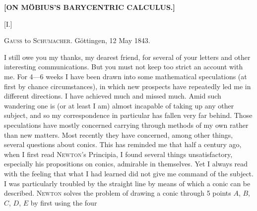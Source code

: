 \clearpage{}
\begin{center}
\textbf{[ON MÖBIUS'S BARYCENTRIC CALCULUS.]}

\medskip

[I.]
\end{center}

\begin{center}\textsc{Gauss} to \textsc{Schumacher}. Göttingen, 12 May 1843.\end{center}

I still owe you my thanks, my dearest friend, for several of your letters and other
interesting communications. But you must not keep too strict an account with
me. For 4---6 weeks I have been drawn into some
mathematical speculations (at first by chance circumstances), in which new prospects
have repeatedly led me in different directions. I have achieved much and missed much. Amid
such wandering one is (or at least I am) almost incapable of taking up any
other subject, and so my correspondence in particular has fallen very far behind.
Those speculations have mostly concerned carrying through methods of my own
rather than new matters. Most recently they have concerned, among other things, several
questions about conics. This has reminded me that half a
century ago, when I first read \textsc{Newton}'s Principia, I found several things
unsatisfactory, especially his propositions on conics, admirable in themselves.
Yet I always read with the feeling that what I had learned did not give me command of the
subject. I was particularly troubled by the straight line by means of which a conic
can be described. \textsc{Newton} solves the problem of drawing a conic through 5 points $A$, $B$,
$C$, $D$, $E$ by first using the four
